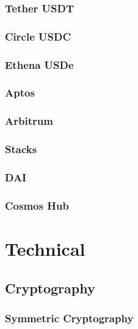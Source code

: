 \documentclass[
  letterpaper,
  DIV=11,
  numbers=noendperiod]{scrreprt}
\begin{document}
\section{Tether USDT}\label{tether-usdt}

\section{Circle USDC}\label{circle-usdc}

\section{Ethena USDe}\label{ethena-usde}

\section{Aptos}\label{aptos}

\section{Arbitrum}\label{arbitrum}

\section{Stacks}\label{stacks}

\section{DAI}\label{dai}

\section{Cosmos Hub}\label{cosmos-hub}

\part{Technical}

\chapter{Cryptography}\label{cryptography}

\section{Symmetric Cryptography}\label{symmetric-cryptography}
\end{document}
